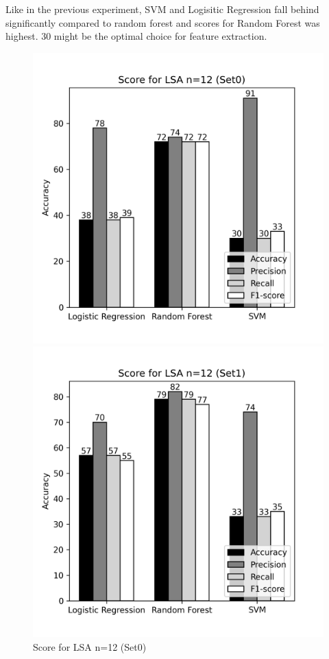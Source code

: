 \documentclass[12pt]{report}
\begin{document}
             Like in the previous experiment, SVM and Logisitic Regression fall behind significantly compared to random forest and scores for Random Forest was highest.
             30 might be the optimal choice for feature extraction.


             \begin{figure}[!htb]
                \begin{minipage}{0.48\textwidth}
                  \centering
                  \includegraphics[scale=0.55]{plots/Score for LSA n=12 (Set0).png}
                  \caption{Score for LSA n=12 (Set0)}\label{Fig:typo1}
                \end{minipage}\hfill
                \begin{minipage}{0.48\textwidth}
                  \centering
                  \includegraphics[scale=0.55]{plots/Score for LSA n=12 (Set1).png}

\end{minipage}
\end{figure}
\end{document}
